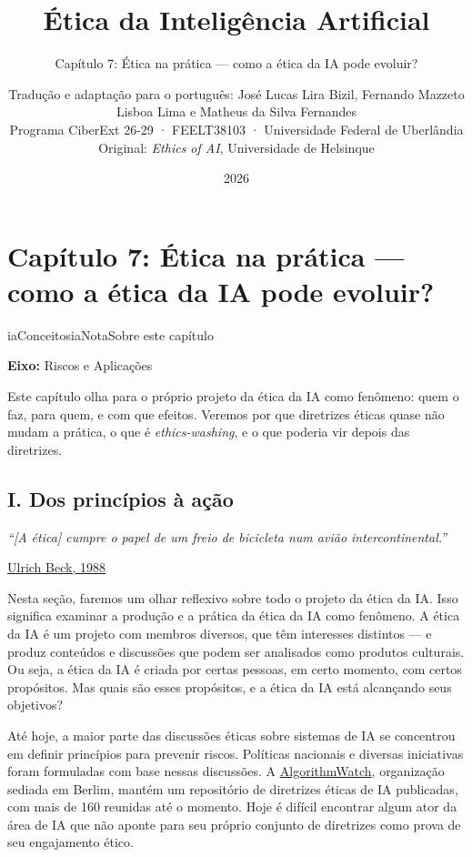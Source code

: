 \documentclass[
  11pt,
]{article}
\title{Ética da Inteligência Artificial}
\subtitle{Capítulo 7: Ética na prática --- como a ética da IA pode
evoluir?}
\author{Tradução e adaptação para o português: José Lucas Lira Bizil,
Fernando Mazzeto Lisboa Lima e Matheus da Silva Fernandes\\
Programa CiberExt 26-29 · FEELT38103 · Universidade Federal de
Uberlândia\\
Original: \emph{Ethics of AI}, Universidade de Helsinque}
\date{2026}
\renewenvironment{quote}
  {\begin{tcolorbox}[
      breakable, enhanced jigsaw, rounded corners,
      arc=3pt, boxrule=0pt, frame hidden,
      colback=iaCaso,
      borderline west={3pt}{0pt}{iaRiscos},
      left=12pt, right=10pt, top=9pt, bottom=9pt,
      before skip=9pt, after skip=9pt]}
  {\end{tcolorbox}}
\newenvironment{nota}[1][Nota]{\begin{iabox}{iaConceitos}{iaNota}{#1}}{\end{iabox}}
\begin{document}
\maketitle

{
\hypersetup{linkcolor=iaConceitos}
\setcounter{tocdepth}{3}
\tableofcontents
}
\section{Capítulo 7: Ética na prática --- como a ética da IA pode
evoluir?}\label{capuxedtulo-7-uxe9tica-na-pruxe1tica-como-a-uxe9tica-da-ia-pode-evoluir}

\begin{nota}[Sobre este capítulo]

\textbf{Eixo:} Riscos e Aplicações

Este capítulo olha para o próprio projeto da ética da IA como fenômeno:
quem o faz, para quem, e com que efeitos. Veremos por que diretrizes
éticas quase não mudam a prática, o que é \emph{ethics-washing}, e o que
poderia vir depois das diretrizes.

\end{nota}

\subsection{I. Dos princípios à
ação}\label{i.-dos-princuxedpios-uxe0-auxe7uxe3o}

\begin{quote}
\emph{``{[}A ética{]} cumpre o papel de um freio de bicicleta num avião
intercontinental.''}

\href{https://fis.uni-bamberg.de/handle/uniba/22015}{Ulrich Beck, 1988}
\end{quote}

Nesta seção, faremos um olhar reflexivo sobre todo o projeto da ética da
IA. Isso significa examinar a produção e a prática da ética da IA como
fenômeno. A ética da IA é um projeto com membros diversos, que têm
interesses distintos --- e produz conteúdos e discussões que podem ser
analisados como produtos culturais. Ou seja, a ética da IA é criada por
certas pessoas, em certo momento, com certos propósitos. Mas quais são
esses propósitos, e a ética da IA está alcançando seus objetivos?

Até hoje, a maior parte das discussões éticas sobre sistemas de IA se
concentrou em definir princípios para prevenir riscos. Políticas
nacionais e diversas iniciativas foram formuladas com base nessas
discussões. A \href{https://algorithmwatch.org/}{AlgorithmWatch},
organização sediada em Berlim, mantém um repositório de diretrizes
éticas de IA publicadas, com mais de 160 reunidas até o momento. Hoje é
difícil encontrar algum ator da área de IA que não aponte para seu
próprio conjunto de diretrizes como prova de seu engajamento ético.
\end{document}
